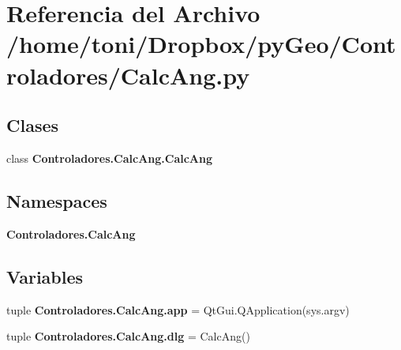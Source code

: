 \section{Referencia del Archivo /home/toni/\-Dropbox/py\-Geo/\-Controladores/\-Calc\-Ang.py}
\label{CalcAng_8py}
\subsection*{Clases}
\begin{DoxyCompactItemize}
\item 
class {\bf Controladores.\-Calc\-Ang.\-Calc\-Ang}
\end{DoxyCompactItemize}
\subsection*{Namespaces}
\begin{DoxyCompactItemize}
\item 
{\bf Controladores.\-Calc\-Ang}
\end{DoxyCompactItemize}
\subsection*{Variables}
\begin{DoxyCompactItemize}
\item 
tuple {\bf Controladores.\-Calc\-Ang.\-app} = Qt\-Gui.\-Q\-Application(sys.\-argv)
\item 
tuple {\bf Controladores.\-Calc\-Ang.\-dlg} = Calc\-Ang()
\end{DoxyCompactItemize}
